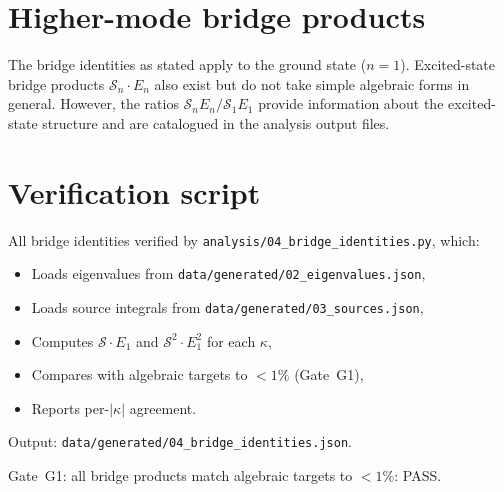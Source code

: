 \documentclass[11pt,letterpaper]{article}
\numberwithin{equation}{section}
\begin{document}
\section{Higher-mode bridge products}
\label{sec:higher}

The bridge identities as stated apply to the ground state ($n = 1$).
Excited-state bridge products $\mathcal{S}_n \cdot E_n$ also exist but do
not take simple algebraic forms in general. However, the ratios
$\mathcal{S}_n E_n / \mathcal{S}_1 E_1$ provide information about the
excited-state structure and are catalogued in the analysis output files.

\section{Verification script}
\label{sec:verification}

All bridge identities verified by \texttt{analysis/04\_bridge\_identities.py},
which:
\begin{itemize}
  \item Loads eigenvalues from \texttt{data/generated/02\_eigenvalues.json},
  \item Loads source integrals from \texttt{data/generated/03\_sources.json},
  \item Computes $\mathcal{S} \cdot E_1$ and $\mathcal{S}^2 \cdot E_1^2$
    for each $\kappa$,
  \item Compares with algebraic targets to $< 1\%$ (Gate~G1),
  \item Reports per-$|\kappa|$ agreement.
\end{itemize}

Output: \texttt{data/generated/04\_bridge\_identities.json}.

Gate~G1: all bridge products match algebraic targets to $< 1\%$: PASS.
\end{document}
